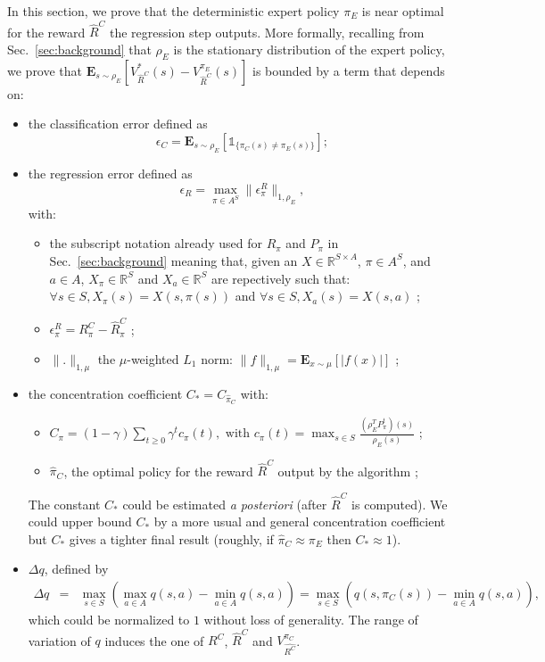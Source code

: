 \documentclass[smallextended]{svjour3}
\newcommand{\E}{\mathbf{E}}
\begin{document}
In this section, we prove that the deterministic expert policy $\pi_E$ is near optimal for the reward $\hat{R}^C$ the regression step outputs.
More formally, recalling from Sec.~\ref{sec:background} that $\rho_E$ is the stationary distribution of the expert policy, we prove that $\E_{s\sim\rho_E}[V^*_{\hat{R}^C}(s)-V^{\pi_E}_{\hat{R}^C}(s)]$ is bounded by a term that depends on:
\begin{itemize}
  \item the classification error defined as
\begin{equation}  
\epsilon_C=\E_{s\sim\rho_E}[\mathds{1}_{\{\pi_C(s)\neq\pi_E(s)\}}];
\end{equation}
\item the regression error defined as 
  \begin{equation}
    \epsilon_R=\max_{\pi\in A^S}\|\epsilon_\pi^R\|_{1,\rho_E},
  \end{equation}
  with:
  \begin{itemize}
  \item the subscript notation already used for $R_\pi$ and $P_\pi$ in Sec.~\ref{sec:background} meaning that, given an $X\in\mathbb{R}^{S\times A}$, $\pi\in A^S$, and $a\in A$,  $X_\pi\in\mathbb{R}^S$ and $X_a\in\mathbb{R}^S$ are repectively such that: $\forall s\in S, X_\pi(s)=X(s,\pi(s))$ and $\forall s\in S, X_a(s)=X(s,a)$ ;
  \item $\epsilon^R_\pi=R^C_\pi-\hat{R}^C_\pi$ ;
  \item $\|.\|_{1,\mu}$ the $\mu$-weighted $L_1$ norm: $\|f\|_{1,\mu} = \E_{x\sim \mu}[|f(x)|]$ ;
  \end{itemize}
\item the concentration coefficient $C_* = C_{\hat \pi_C}$ with:
  \begin{itemize}
  \item $C_{\pi}=(1-\gamma)\sum_{t\geq0}\gamma^tc_{\pi}(t), \text{ with } c_{\pi}(t)=\max_{s\in S}\frac{(\rho_E^TP^t_\pi)(s)}{\rho_E(s)}$ ;
  \item $\hat \pi_C$, the optimal policy for the reward $\hat R^C$ output by the algorithm ;
  \end{itemize}
  The constant $C_*$ could be estimated \emph{a posteriori} (after $\hat{R}^C$ is computed). We could upper bound $C_*$ by a more usual and general concentration coefficient but $C_*$ gives a tighter final result (roughly, if $\hat{\pi}_C\approx\pi_E$ then $C_* \approx 1$).
\item $\Delta q$, defined by 
  \begin{eqnarray}
    \Delta q &= &\max_{s\in S}(\max_{a\in A}q(s,a)-\min_{a\in A}q(s,a))=\max_{s\in S}(q(s,\pi_C(s))-\min_{a\in A}q(s,a)),
    \end{eqnarray} which could be normalized to $1$ without loss of generality. The range of variation of $q$ induces the one of $R^C$, $\hat{R}^C$ and $V^{\pi_C}_{\hat{R^C}}$.
  \end{itemize}
\end{document}
